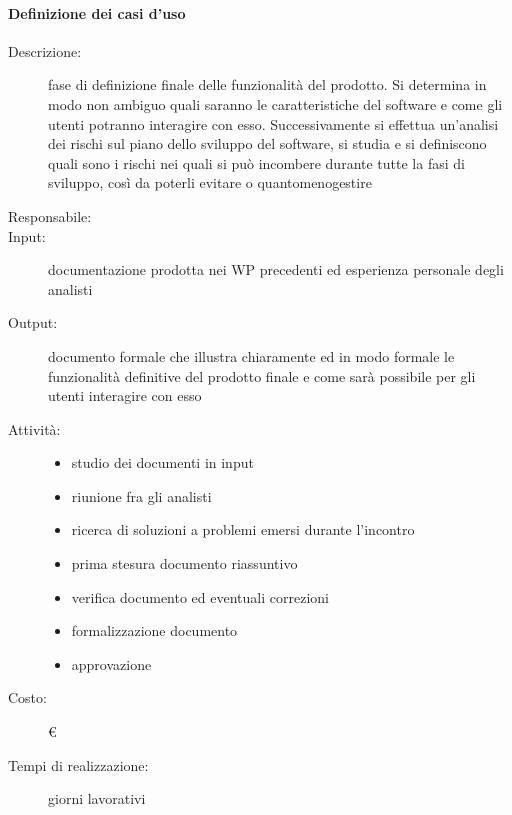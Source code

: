 \paragraph{Definizione dei casi d'uso}
\begin{description}
\item[Descrizione:]fase di definizione finale delle funzionalità del prodotto. Si determina
in modo non ambiguo quali saranno le caratteristiche del software e come gli utenti
potranno interagire con esso. Successivamente si effettua un’analisi dei rischi sul piano dello sviluppo
del software, si studia e si definiscono quali sono i rischi nei quali si
può incombere durante tutte la fasi di sviluppo, così da poterli evitare o quantomenogestire

\item[Responsabile:] 

\item[Input: ]documentazione prodotta nei WP precedenti ed esperienza personale degli
analisti

\item[Output:] documento formale che illustra chiaramente ed in modo formale le funzionalità
definitive del prodotto finale e come sarà possibile per gli utenti interagire con esso

\item[Attività:]
\begin{itemize}
\item studio dei documenti in input
\item riunione fra gli analisti
\item ricerca di soluzioni a problemi emersi durante l’incontro
\item prima stesura documento riassuntivo
\item verifica documento ed eventuali correzioni
\item formalizzazione documento
\item approvazione
\end{itemize}

\item[Costo:] \euro{}
\item[Tempi di realizzazione:]  giorni lavorativi
\end{description}




